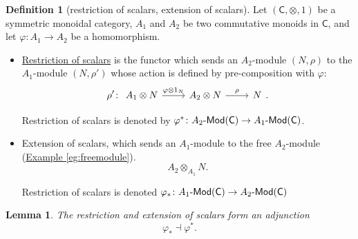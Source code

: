 \documentclass[a4paper]{report}
\newcommand{\defn}[1]{\ul{#1}}
\def\mhyp{{\hbox{-}}}
\theoremstyle{definition}
\newtheorem{definition}{Definition}[section]
\theoremstyle{plain}
\newtheorem{lemma}{Lemma}[section]
\theoremstyle{remark}
\begin{document}
\begin{definition}[restriction of scalars, extension of scalars]
  \label{def:extensionrestrictionofscalars}
  Let $(\mathsf{C}, \otimes, 1)$ be a symmetric monoidal category, $A_{1}$ and $A_{2}$ be two commutative monoids in $\mathsf{C}$, and let $\varphi\colon A_{1} \to A_{2}$ be a homomorphism.
  \begin{itemize}
    \item \defn{Restriction of scalars} is the functor which sends an $A_{2}$-module $(N, \rho)$ to the $A_{1}$-module $(N, \rho')$ whose action is defined by pre-composition with $\varphi$:
      \begin{equation*}
        \rho' \colon 
        \begin{tikzcd}
          A_{1} \otimes N
          \arrow[r, "\varphi \otimes 1_{N}"]
          & A_{2} \otimes N
          \arrow[r, "\rho"]
          & N
        \end{tikzcd}.
      \end{equation*}

      Restriction of scalars is denoted by $\varphi^{*}\colon A_{2}\mhyp\mathsf{Mod}(\mathsf{C}) \to A_{1}\mhyp\mathsf{Mod}(\mathsf{C})$.

    \item Extension of scalars, which sends an $A_{1}$-module to the free $A_{2}$-module (\hyperref[eg:freemodule]{Example \ref*{eg:freemodule}}).
      \begin{equation*}
        A_{2} \otimes_{A_{1}} N.
      \end{equation*}

      Restriction of scalars is denoted $\varphi_{*}\colon A_{1}\mhyp\mathsf{Mod}(\mathsf{C}) \to A_{2}\mhyp\mathsf{Mod}(\mathsf{C})$
  \end{itemize}
\end{definition}

\begin{lemma}
  The restriction and extension of scalars form an adjunction
  \begin{equation*}
    \varphi_{*} \dashv \varphi^{*}.
  \end{equation*}
\end{lemma}
\end{document}
